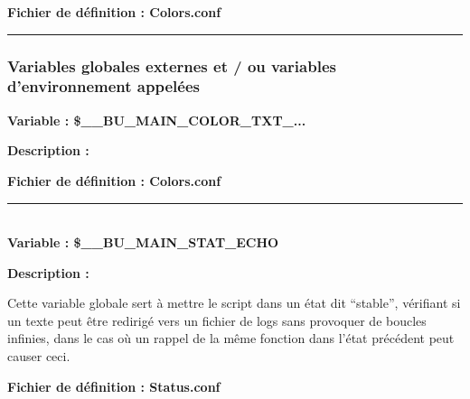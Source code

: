 \documentclass[a4paper,10pt]{article}
\begin{document}
\textbf{Fichier de définition : \color{path}Colors.conf}\\[1\baselineskip]



\color{sec3}\par\noindent\rule{\textwidth}{0.4pt}\color{text}

\color{sec3}
\subsubsection{Variables globales externes et / ou variables d'environnement appelées}\color{text}

\textbf{Variable : \color{vars}\$\_\_BU\_MAIN\_COLOR\_TXT\_...}\\[1\baselineskip]

\setlength{\parskip}{2em}

\begin{justify}
    \textbf{Description :}
\end{justify}

\textbf{Fichier de définition : \color{path}Colors.conf}\\[1\baselineskip]




\color{vars}\par\noindent\rule{\textwidth}{0.4pt}\color{text}\\[1\baselineskip]

\textbf{Variable : \color{vars}\$\_\_BU\_MAIN\_STAT\_ECHO}\\[1\baselineskip]

\setlength{\parskip}{2em}

\begin{justify}
    \textbf{Description :}
\end{justify}

\setlength{\parskip}{1em}

\begin{justify}
    Cette variable globale sert à mettre le script dans un état dit ``stable'', vérifiant si un texte peut être redirigé vers un fichier de logs sans provoquer de boucles infinies, dans le cas où un rappel de la même fonction dans l'état précédent peut causer ceci.
\end{justify}

\textbf{Fichier de définition : \color{path}Status.conf}\\[1\baselineskip]
\end{document}
